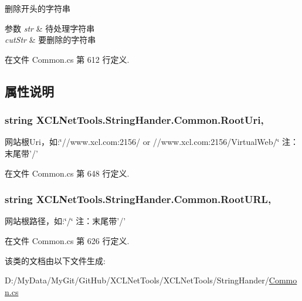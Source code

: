 删除开头的字符串 


\begin{DoxyParams}{参数}
{\em str} & 待处理字符串\\
\hline
{\em cut\-Str} & 要删除的字符串\\
\hline
\end{DoxyParams}


在文件 Common.\-cs 第 612 行定义.



\subsection{属性说明}
\hypertarget{class_x_c_l_net_tools_1_1_string_hander_1_1_common_ae924e6a3e073efd4a75d53ea7095f976}{
\subsubsection[{Root\-Uri}]{\setlength{\rightskip}{0pt plus 5cm}string X\-C\-L\-Net\-Tools.\-String\-Hander.\-Common.\-Root\-Uri\hspace{0.3cm}{\ttfamily [static]}, {\ttfamily [get]}}}\label{class_x_c_l_net_tools_1_1_string_hander_1_1_common_ae924e6a3e073efd4a75d53ea7095f976}


网站根\-Uri，如\-:\char`\"{}//www.\-xcl.\-com\-:2156/ or //www.\-xcl.\-com\-:2156/\-Virtual\-Web/\char`\"{} 注：末尾带'/' 



在文件 Common.\-cs 第 648 行定义.

\hypertarget{class_x_c_l_net_tools_1_1_string_hander_1_1_common_a87e9775b7bdaaf9bc205a148b1335ee2}{
\subsubsection[{Root\-U\-R\-L}]{\setlength{\rightskip}{0pt plus 5cm}string X\-C\-L\-Net\-Tools.\-String\-Hander.\-Common.\-Root\-U\-R\-L\hspace{0.3cm}{\ttfamily [static]}, {\ttfamily [get]}}}\label{class_x_c_l_net_tools_1_1_string_hander_1_1_common_a87e9775b7bdaaf9bc205a148b1335ee2}


网站根路径，如\-:\char`\"{}/\char`\"{} 注：末尾带'/' 



在文件 Common.\-cs 第 626 行定义.



该类的文档由以下文件生成\-:\begin{DoxyCompactItemize}
\item 
D\-:/\-My\-Data/\-My\-Git/\-Git\-Hub/\-X\-C\-L\-Net\-Tools/\-X\-C\-L\-Net\-Tools/\-String\-Hander/\hyperlink{_common_8cs}{Common.\-cs}\end{DoxyCompactItemize}
